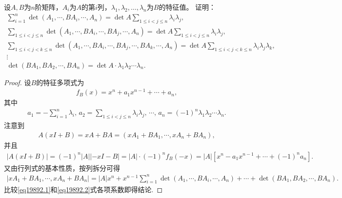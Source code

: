 \documentclass[../../main.tex]{subfiles}
\begin{document}
\begin{example}
设\( A,B \)为\( n \)阶矩阵，\( A_i \)为\( A \)的第\( i \)列，\( \lambda_1,\lambda_2,\dots,\lambda_n \)为\( B \)的特征值。
证明：
\begin{gather*}
\sum_{i=1}^n{\det \left( A_1,\cdots ,BA_i,\cdots ,A_n \right)}=\det A\sum_{1\le i<j\le n}{\lambda _i\lambda _j},
\\
\sum_{1\le i<j\le n}{\det \left( A_1,\cdots ,BA_i,\cdots ,BA_j,\cdots ,A_n \right)}=\det A\sum_{1\le i<j\le n}{\lambda _i\lambda _j},
\\
\sum_{1\le i<j<k\le n}{\det \left( A_1,\cdots ,BA_i,\cdots ,BA_j,\cdots ,BA_k,\cdots ,A_n \right)}=\det A\sum_{1\le i<j<k\le n}{\lambda _i\lambda _j\lambda _k},
\\
\vdots 
\\
\det \left( BA_1,BA_2,\cdots ,BA_n \right) =\det A\cdot \lambda _1\lambda _2\cdots \lambda _n.
\end{gather*}
\end{example}
\begin{proof}
设\( B \)的特征多项式为
\begin{align*}
f_B(x) = x^n + a_1x^{n-1} + \cdots + a_n,
\end{align*}
其中
\begin{align*}
a_1 = -\sum_{i=1}^n \lambda_i,\, a_2 = \sum_{1 \leqslant i < j \leqslant n} \lambda_i\lambda_j,\, \cdots,\, a_n = (-1)^n \lambda_1\lambda_2\cdots\lambda_n.
\end{align*}
注意到
\begin{align*}
A(xI + B) = xA + BA = (xA_1 + BA_1, \cdots, xA_n + BA_n),
\end{align*}
并且
\begin{align}
|A(xI + B)| = (-1)^n |A| |-xI - B| = |A| \cdot (-1)^n f_B(-x) = |A| \left[ x^n - a_1x^{n-1} + \cdots + (-1)^n a_n \right]. \label{eq19892.1}
\end{align}
又由行列式的基本性质，按列拆分可得
\begin{align}
|xA_1 + BA_1, \cdots, xA_n + BA_n| = |A|x^n + x^{n-1} \sum_{i=1}^n \det(A_1, \cdots, BA_i, \cdots, A_n) + \cdots + \det(BA_1, BA_2, \cdots, BA_n). \label{eq19892.2}
\end{align}
比较\eqref{eq19892.1}和\eqref{eq19892.2}式各项系数即得结论.

\end{proof}
\end{document}
